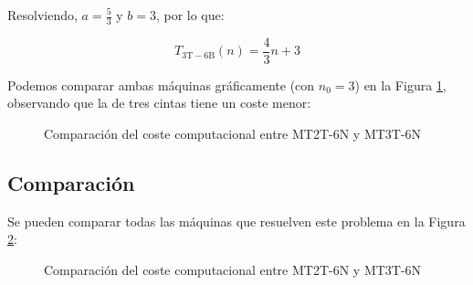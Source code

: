 Resolviendo, $a=\frac{5}{3}$ y $b=3$, por lo que:

\begin{equation}
    T_{\mathrm{3T-6B}}(n) = \frac{4}{3}n + 3
\end{equation}


Podemos comparar ambas máquinas gráficamente (con $n_0 = 3$) en la Figura \ref{fig:MT-6B}, observando que la de tres cintas tiene un coste menor:

\begin{figure}[H]
    \centering
    
    \caption{Comparación del coste computacional entre MT2T-6N y MT3T-6N}
    \label{fig:MT-6B}
\end{figure}


\subsection*{Comparación}
Se pueden comparar todas las máquinas que resuelven este problema en la Figura \ref{fig:MT-6}:
\begin{figure}[H]
    \centering
    
    \caption{Comparación del coste computacional entre MT2T-6N y MT3T-6N}
    \label{fig:MT-6}
\end{figure}